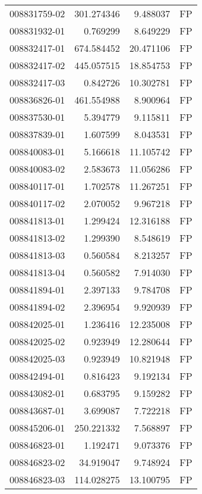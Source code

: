\begin{tabular}{lrrl}
008831759-02 &  301.274346 &       9.488037 &   FP \\
008831932-01 &    0.769299 &       8.649229 &   FP \\
008832417-01 &  674.584452 &      20.471106 &   FP \\
008832417-02 &  445.057515 &      18.854753 &   FP \\
008832417-03 &    0.842726 &      10.302781 &   FP \\
008836826-01 &  461.554988 &       8.900964 &   FP \\
008837530-01 &    5.394779 &       9.115811 &   FP \\
008837839-01 &    1.607599 &       8.043531 &   FP \\
008840083-01 &    5.166618 &      11.105742 &   FP \\
008840083-02 &    2.583673 &      11.056286 &   FP \\
008840117-01 &    1.702578 &      11.267251 &   FP \\
008840117-02 &    2.070052 &       9.967218 &   FP \\
008841813-01 &    1.299424 &      12.316188 &   FP \\
008841813-02 &    1.299390 &       8.548619 &   FP \\
008841813-03 &    0.560584 &       8.213257 &   FP \\
008841813-04 &    0.560582 &       7.914030 &   FP \\
008841894-01 &    2.397133 &       9.784708 &   FP \\
008841894-02 &    2.396954 &       9.920939 &   FP \\
008842025-01 &    1.236416 &      12.235008 &   FP \\
008842025-02 &    0.923949 &      12.280644 &   FP \\
008842025-03 &    0.923949 &      10.821948 &   FP \\
008842494-01 &    0.816423 &       9.192134 &   FP \\
008843082-01 &    0.683795 &       9.159282 &   FP \\
008843687-01 &    3.699087 &       7.722218 &   FP \\
008845206-01 &  250.221332 &       7.568897 &   FP \\
008846823-01 &    1.192471 &       9.073376 &   FP \\
008846823-02 &   34.919047 &       9.748924 &   FP \\
008846823-03 &  114.028275 &      13.100795 &   FP \\

\end{tabular}
